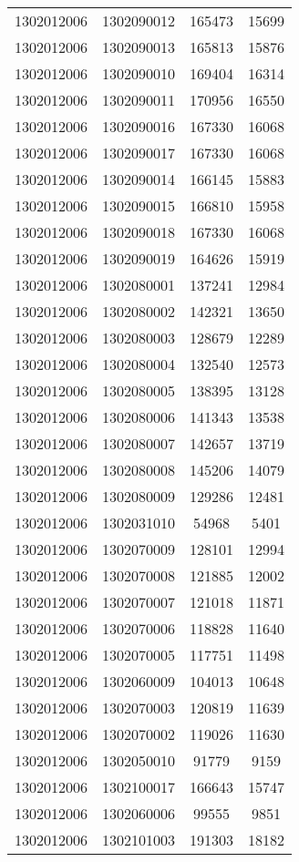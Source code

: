\begin{longtable}{llcc}
1302012006 & 1302090012 & 165473 & 15699\\
1302012006 & 1302090013 & 165813 & 15876\\
1302012006 & 1302090010 & 169404 & 16314\\
1302012006 & 1302090011 & 170956 & 16550\\
1302012006 & 1302090016 & 167330 & 16068\\
1302012006 & 1302090017 & 167330 & 16068\\
1302012006 & 1302090014 & 166145 & 15883\\
1302012006 & 1302090015 & 166810 & 15958\\
1302012006 & 1302090018 & 167330 & 16068\\
1302012006 & 1302090019 & 164626 & 15919\\
1302012006 & 1302080001 & 137241 & 12984\\
1302012006 & 1302080002 & 142321 & 13650\\
1302012006 & 1302080003 & 128679 & 12289\\
1302012006 & 1302080004 & 132540 & 12573\\
1302012006 & 1302080005 & 138395 & 13128\\
1302012006 & 1302080006 & 141343 & 13538\\
1302012006 & 1302080007 & 142657 & 13719\\
1302012006 & 1302080008 & 145206 & 14079\\
1302012006 & 1302080009 & 129286 & 12481\\
1302012006 & 1302031010 & 54968 & 5401\\
1302012006 & 1302070009 & 128101 & 12994\\
1302012006 & 1302070008 & 121885 & 12002\\
1302012006 & 1302070007 & 121018 & 11871\\
1302012006 & 1302070006 & 118828 & 11640\\
1302012006 & 1302070005 & 117751 & 11498\\
1302012006 & 1302060009 & 104013 & 10648\\
1302012006 & 1302070003 & 120819 & 11639\\
1302012006 & 1302070002 & 119026 & 11630\\
1302012006 & 1302050010 & 91779 & 9159\\
1302012006 & 1302100017 & 166643 & 15747\\
1302012006 & 1302060006 & 99555 & 9851\\
1302012006 & 1302101003 & 191303 & 18182\\

\end{longtable}
